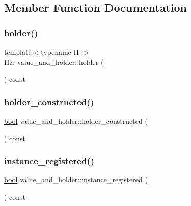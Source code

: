 \subsection{Member Function Documentation}
\mbox{\label{structvalue__and__holder_ad375bce60ea6528d046069d0fefa6d5b}} 
\subsubsection{\texorpdfstring{holder()}{holder()}}
{\footnotesize\ttfamily template$<$typename H $>$ \\
H\& value\+\_\+and\+\_\+holder\+::holder (\begin{DoxyParamCaption}{ }\end{DoxyParamCaption}) const\hspace{0.3cm}{\ttfamily [inline]}}

\mbox{\label{structvalue__and__holder_ad4cae8c2fae04fcc54135883a509230f}} 
\subsubsection{\texorpdfstring{holder\_constructed()}{holder\_constructed()}}
{\footnotesize\ttfamily \mbox{\hyperlink{asdl_8h_af6a258d8f3ee5206d682d799316314b1}{bool}} value\+\_\+and\+\_\+holder\+::holder\+\_\+constructed (\begin{DoxyParamCaption}{ }\end{DoxyParamCaption}) const\hspace{0.3cm}{\ttfamily [inline]}}

\mbox{\label{structvalue__and__holder_ab48e48cb6e8746363dd03270599d3f7c}} 
\subsubsection{\texorpdfstring{instance\_registered()}{instance\_registered()}}
{\footnotesize\ttfamily \mbox{\hyperlink{asdl_8h_af6a258d8f3ee5206d682d799316314b1}{bool}} value\+\_\+and\+\_\+holder\+::instance\+\_\+registered (\begin{DoxyParamCaption}{ }\end{DoxyParamCaption}) const\hspace{0.3cm}{\ttfamily [inline]}}

